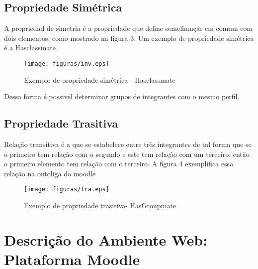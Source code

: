 \subsection{Propriedade Simétrica}
A propriedad de simetria é a propriedade que define semelhanças em comum com dois elementos, como mostrado na figura 3. Um exemplo de propriedade simétrica é a Hasclassmate.


 \begin{figure}[ht]
  \centering
    \texttt{[image: figuras/inv.eps]}
  \caption{Exemplo de propriedade simétrica - Hasclassmate}
\end{figure}

Dessa forma é possivel determinar grupos de integrantes com o mesmo perfil.

\subsection{Propriedade Trasitiva}
Relação transitiva é a que se estabelece entre três integrantes de tal forma que se o primeiro tem relação com o segundo e este tem relação com um terceiro, então o primeiro elemento tem relação com o terceiro. A figura 4 exemplifica essa relação na ontoliga do moodle


 \begin{figure}[ht]
  \centering
    \texttt{[image: figuras/tra.eps]}
  \caption{Exemplo de propriedade trasitiva- HasGroupmate}
\end{figure}

\section{Descrição do Ambiente Web: Plataforma Moodle}

